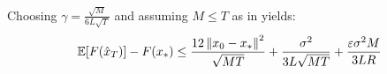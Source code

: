\begin{corollary} \label{}
    Choosing $\gamma = \frac{\sqrt{M}}{6 L\sqrt{T}}$ and assuming $M \leq T$ as in \cite{Khaled} yields:
    \begin{align}
        \mathbb{E}[F(\hat{x}_T)] - F(x_*)
        \leq
          \frac{12 \left\|x_0-x_*\right\|^2}{\sqrt{MT}} + \frac{\sigma^2}{3 L\sqrt{MT}} + \frac{
          \varepsilon \sigma^2 M}{3LR}
    \end{align}
\end{corollary}
